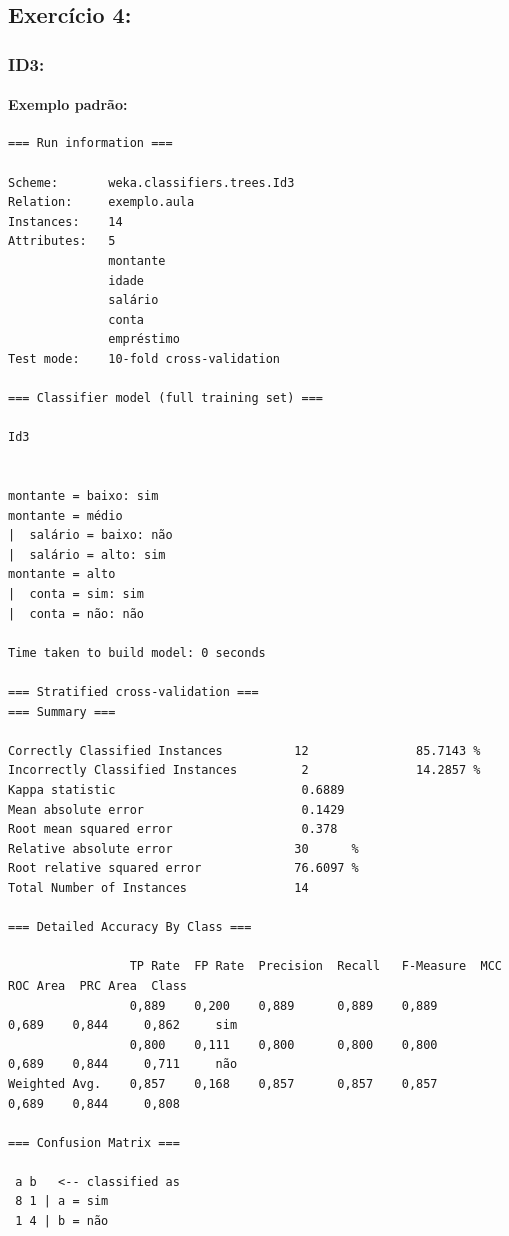 \documentclass[
    article,            %
    11pt,               %
    oneside,            %
    a4paper,            %
    english,            %
    brazil,             %
    sumario=tradicional,
    ]{abntex2}
\begin{document}
\subsection*{\textbf{Exercício 4:}}

\subsubsection*{\textbf{ID3:}}

\paragraph*{\textbf{Exemplo padrão:}}

\begin{Verbatim}[frame=single, fontsize=\tiny]
=== Run information ===

Scheme:       weka.classifiers.trees.Id3 
Relation:     exemplo.aula
Instances:    14
Attributes:   5
              montante
              idade
              salário
              conta
              empréstimo
Test mode:    10-fold cross-validation

=== Classifier model (full training set) ===

Id3


montante = baixo: sim
montante = médio
|  salário = baixo: não
|  salário = alto: sim
montante = alto
|  conta = sim: sim
|  conta = não: não

Time taken to build model: 0 seconds

=== Stratified cross-validation ===
=== Summary ===

Correctly Classified Instances          12               85.7143 %
Incorrectly Classified Instances         2               14.2857 %
Kappa statistic                          0.6889
Mean absolute error                      0.1429
Root mean squared error                  0.378 
Relative absolute error                 30      %
Root relative squared error             76.6097 %
Total Number of Instances               14     

=== Detailed Accuracy By Class ===

                 TP Rate  FP Rate  Precision  Recall   F-Measure  MCC      ROC Area  PRC Area  Class
                 0,889    0,200    0,889      0,889    0,889      0,689    0,844     0,862     sim
                 0,800    0,111    0,800      0,800    0,800      0,689    0,844     0,711     não
Weighted Avg.    0,857    0,168    0,857      0,857    0,857      0,689    0,844     0,808     

=== Confusion Matrix ===

 a b   <-- classified as
 8 1 | a = sim
 1 4 | b = não
 \end{Verbatim}
\end{document}
